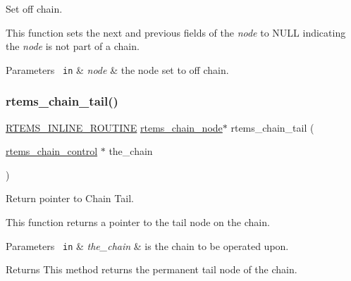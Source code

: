 Set off chain. 

This function sets the next and previous fields of the {\itshape node} to N\+U\+LL indicating the {\itshape node} is not part of a chain.


\begin{DoxyParams}[1]{Parameters}
\mbox{\texttt{ in}}  & {\em node} & the node set to off chain. \\
\hline
\end{DoxyParams}
\mbox{\label{group__ClassicChains_gabf61205eb68029cabb6e06322454af34}} 
\subsubsection{\texorpdfstring{rtems\_chain\_tail()}{rtems\_chain\_tail()}}
{\footnotesize\ttfamily \mbox{\hyperlink{group__RTEMSScoreBaseDefs_gac216239df231d5dbd15e3520b0b9313f}{R\+T\+E\+M\+S\+\_\+\+I\+N\+L\+I\+N\+E\+\_\+\+R\+O\+U\+T\+I\+NE}} \mbox{\hyperlink{structChain__Node__struct}{rtems\+\_\+chain\+\_\+node}}$\ast$ rtems\+\_\+chain\+\_\+tail (\begin{DoxyParamCaption}\item[{\mbox{\hyperlink{unionChain__Control}{rtems\+\_\+chain\+\_\+control}} $\ast$}]{the\+\_\+chain }\end{DoxyParamCaption})}



Return pointer to Chain Tail. 

This function returns a pointer to the tail node on the chain.


\begin{DoxyParams}[1]{Parameters}
\mbox{\texttt{ in}}  & {\em the\+\_\+chain} & is the chain to be operated upon.\\
\hline
\end{DoxyParams}
\begin{DoxyReturn}{Returns}
This method returns the permanent tail node of the chain. 
\end{DoxyReturn}
